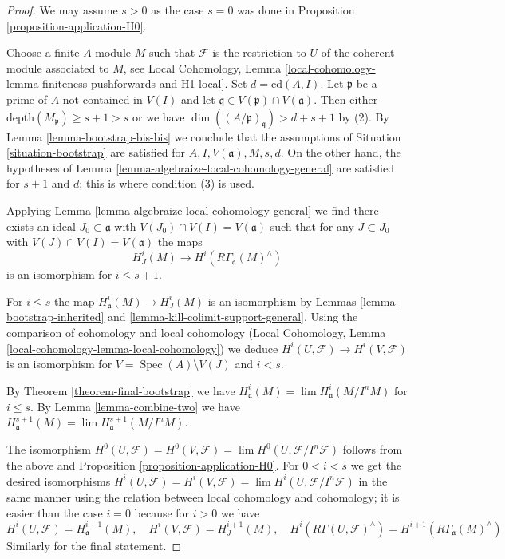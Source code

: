 \documentclass{stacks-project}
\theoremstyle{plain}
\theoremstyle{definition}
\theoremstyle{remark}
\numberwithin{equation}{subsection}
\def\lim{\mathop{\mathrm{lim}}\nolimits}
\def\Spec{\mathop{\mathrm{Spec}}}
\begin{document}
\begin{proof}
We may assume $s > 0$ as the case $s = 0$ was done in
Proposition \ref{proposition-application-H0}.

\medskip\noindent
Choose a finite $A$-module $M$ such that $\mathcal{F}$ is the restriction
to $U$ of the coherent module associated to $M$, see Local Cohomology,
Lemma \ref{local-cohomology-lemma-finiteness-pushforwards-and-H1-local}.
Set $d = \text{cd}(A, I)$.
Let $\mathfrak p$ be a prime of $A$ not contained in $V(I)$
and let $\mathfrak q \in V(\mathfrak p) \cap V(\mathfrak a)$.
Then either $\text{depth}(M_\mathfrak p) \geq s + 1 > s$
or we have $\dim((A/\mathfrak p)_\mathfrak q) > d + s + 1$ by (2).
By Lemma \ref{lemma-bootstrap-bis-bis} we conclude that the
assumptions of Situation \ref{situation-bootstrap}
are satisfied for $A, I, V(\mathfrak a), M, s, d$.
On the other hand, the hypotheses of
Lemma \ref{lemma-algebraize-local-cohomology-general}
are satisfied for $s + 1$ and $d$; this is where condition (3) is used.

\medskip\noindent
Applying Lemma \ref{lemma-algebraize-local-cohomology-general}
we find there exists an ideal
$J_0 \subset \mathfrak a$ with $V(J_0) \cap V(I) = V(\mathfrak a)$
such that for any $J \subset J_0$ with $V(J) \cap V(I) = V(\mathfrak a)$
the maps
$$
H^i_J(M) \longrightarrow H^i(R\Gamma_\mathfrak a(M)^\wedge)
$$
is an isomorphism for $i \leq s + 1$.

\medskip\noindent
For $i \leq s$ the map $H^i_\mathfrak a(M) \to H^i_J(M)$
is an isomorphism by Lemmas \ref{lemma-bootstrap-inherited} and
\ref{lemma-kill-colimit-support-general}.
Using the comparison of cohomology and local cohomology
(Local Cohomology, Lemma \ref{local-cohomology-lemma-local-cohomology})
we deduce
$H^i(U, \mathcal{F}) \to H^i(V,\mathcal{F})$
is an isomorphism for $V = \Spec(A) \setminus V(J)$ and
$i < s$.

\medskip\noindent
By Theorem \ref{theorem-final-bootstrap} we have
$H^i_\mathfrak a(M) = \lim H^i_\mathfrak a(M/I^nM)$
for $i \leq s$. By Lemma \ref{lemma-combine-two} we have
$H^{s + 1}_\mathfrak a(M) = \lim H^{s + 1}_\mathfrak a(M/I^nM)$.

\medskip\noindent
The isomorphism $H^0(U, \mathcal{F}) = H^0(V, \mathcal{F}) =
\lim H^0(U, \mathcal{F}/I^n\mathcal{F})$ follows from the above and
Proposition \ref{proposition-application-H0}.
For $0 < i < s$ we get the desired isomorphisms
$H^i(U, \mathcal{F}) = H^i(V, \mathcal{F}) =
\lim H^i(U, \mathcal{F}/I^n\mathcal{F})$ in
the same manner using the relation between local cohomology
and cohomology; it is easier than the case $i = 0$
because for $i > 0$ we have
$$
H^i(U, \mathcal{F}) = H^{i + 1}_\mathfrak a(M),
\quad
H^i(V, \mathcal{F}) = H^{i + 1}_J(M),
\quad
H^i(R\Gamma(U, \mathcal{F})^\wedge) = 
H^{i + 1}(R\Gamma_\mathfrak a(M)^\wedge)
$$
Similarly for the final statement.
\end{proof}
\end{document}
